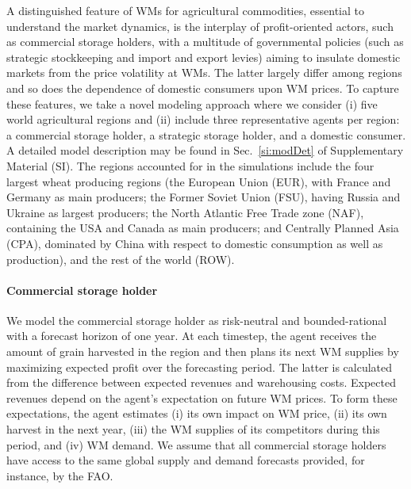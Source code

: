 \documentclass[12pt]{article}
\begin{document}
A distinguished feature of WMs for agricultural commodities, essential to understand the market dynamics, is the interplay of profit-oriented actors, such as commercial storage holders, with a multitude of governmental policies (such as strategic stockkeeping and import and export levies) aiming to insulate domestic markets from the price volatility at WMs. The latter  largely differ among regions and so does the dependence of domestic consumers upon WM prices. To capture these features, we take a novel modeling approach where we consider (i) five world agricultural regions and (ii) include three representative agents per region: a commercial storage holder, a strategic storage holder, and a domestic consumer.
%
%
A detailed model description may be found in Sec.~\ref{si:modDet} of Supplementary Material (SI). The regions accounted for in the simulations include the four largest wheat producing regions (the European Union (EUR), with France and Germany as main producers; the Former Soviet Union (FSU), having Russia and Ukraine as largest producers; the North Atlantic Free Trade zone (NAF), containing the USA and Canada as main producers; and Centrally Planned Asia (CPA), dominated by China with respect to domestic consumption as well as production), and the rest of the world (ROW). 

\paragraph*{Commercial storage holder}
We model the commercial storage holder  as risk-neutral and bounded-rational with a forecast horizon of one year. At each timestep, the agent receives the amount of grain harvested in the region and then plans its next WM supplies by maximizing expected profit over the forecasting period. The latter is calculated from the difference between expected revenues and warehousing costs. Expected revenues depend on the agent's expectation on future WM prices. To form these expectations, the agent estimates (i) its own impact on WM price, (ii) its own harvest in the next year, (iii) the WM supplies of its competitors during this period, and (iv) WM demand. We assume that all commercial storage holders have access to the same global supply and demand forecasts provided, for instance, by the FAO.
\end{document}
